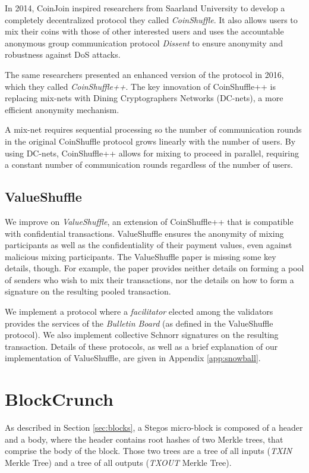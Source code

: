 \documentclass[8pt,fleqn,openany]{book}
\begin{document}
In 2014, CoinJoin inspired researchers from Saarland University to develop a completely decentralized protocol they called \textit{CoinShuffle}\cite{c17}. It also allows users to mix their coins with those of other interested users and uses the accountable anonymous group communication protocol \textit{Dissent} to ensure anonymity and robustness against DoS attacks. 

The same researchers presented an enhanced version of the protocol in 2016, which they called \textit{CoinShuffle++}\cite{c18}. The key innovation of CoinShuffle++ is replacing mix-nets with Dining Cryptographers Networks (DC-nets)\cite{c20}, a more efficient anonymity mechanism. 

A mix-net requires sequential processing so the number of communication rounds in the original CoinShuffle protocol grows linearly with the number of users. By using DC-nets, CoinShuffle++ allows for mixing to proceed in parallel, requiring a constant number of communication rounds regardless of the number of users. 
	
\subsection{ValueShuffle}
We improve on \textit{ValueShuffle}\cite{c19}, an extension of CoinShuffle++ that is compatible with confidential transactions. ValueShuffle ensures the anonymity of mixing participants as well as the confidentiality of their payment values, even against malicious mixing participants. The ValueShuffle paper is missing some key details, though. For example, the paper provides neither details on forming a pool of senders who wish to mix their transactions, nor the details on how to form a signature on the resulting pooled transaction. 

We implement a protocol where a \textit{facilitator} elected among the validators provides the services of the \textit{Bulletin Board} (as defined in the ValueShuffle protocol). We also implement collective Schnorr signatures\cite{c22} on the resulting transaction. Details of these protocols, as well as a brief explanation of our implementation of ValueShuffle, are given in Appendix \ref{app:snowball}.

\section{BlockCrunch}\label{sec:pruning}
As described in Section \ref{sec:blocks}, a Stegos micro-block is composed of a header and a body, where the header contains root hashes of two Merkle trees, that comprise the body of the block. Those two trees are a tree of all inputs (\textit{TXIN} Merkle Tree) and a tree of all outputs (\textit{TXOUT} Merkle Tree). 
\end{document}
